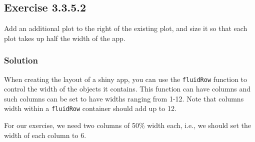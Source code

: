 \documentclass[]{book}
\newenvironment{Shaded}{\begin{snugshade}}{\end{snugshade}}
\newcommand{\ControlFlowTok}[1]{\textcolor[rgb]{0.13,0.29,0.53}{\textbf{#1}}}
\newcommand{\DataTypeTok}[1]{\textcolor[rgb]{0.13,0.29,0.53}{#1}}
\newcommand{\DecValTok}[1]{\textcolor[rgb]{0.00,0.00,0.81}{#1}}
\newcommand{\KeywordTok}[1]{\textcolor[rgb]{0.13,0.29,0.53}{\textbf{#1}}}
\newcommand{\NormalTok}[1]{#1}
\newcommand{\OperatorTok}[1]{\textcolor[rgb]{0.81,0.36,0.00}{\textbf{#1}}}
\newcommand{\StringTok}[1]{\textcolor[rgb]{0.31,0.60,0.02}{#1}}
\begin{document}
\hypertarget{exercise-3.3.5.2}{%
\subsection*{Exercise 3.3.5.2}\label{exercise-3.3.5.2}}

Add an additional plot to the right of the existing plot, and size it so that
each plot takes up half the width of the app.

\begin{solution}

\hypertarget{solution-6}{%
\subsubsection*{Solution}\label{solution-6}}

When creating the layout of a shiny app, you can use the \texttt{fluidRow} function to
control the width of the objects it contains. This function can have columns
and such columns can be set to have widths ranging from 1-12. Note that columns
width within a \texttt{fluidRow} container should add up to 12.

For our exercise, we need two columns of 50\% width each, i.e., we should set
the width of each column to 6.

\begin{Shaded}
\end{Shaded}

\end{solution}
\end{document}
